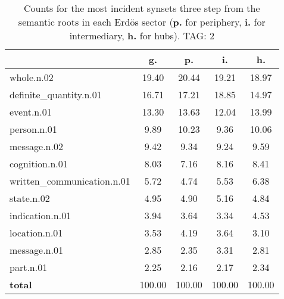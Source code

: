 \begin{table}[h!]
\begin{center}
\begin{tabular}{| l | c | c | c | c |}\hline
 & g. & p. & i. & h. \\\hline
whole.n.02 & 19.40  & 20.44  & 19.21  & 18.97 \\\hline
definite\_quantity.n.01 & 16.71  & 17.21  & 18.85  & 14.97 \\\hline
event.n.01 & 13.30  & 13.63  & 12.04  & 13.99 \\\hline
person.n.01 & 9.89  & 10.23  & 9.36  & 10.06 \\\hline
message.n.02 & 9.42  & 9.34  & 9.24  & 9.59 \\\hline
cognition.n.01 & 8.03  & 7.16  & 8.16  & 8.41 \\\hline
written\_communication.n.01 & 5.72  & 4.74  & 5.53  & 6.38 \\\hline
state.n.02 & 4.95  & 4.90  & 5.16  & 4.84 \\\hline
indication.n.01 & 3.94  & 3.64  & 3.34  & 4.53 \\\hline
location.n.01 & 3.53  & 4.19  & 3.64  & 3.10 \\\hline
message.n.01 & 2.85  & 2.35  & 3.31  & 2.81 \\\hline
part.n.01 & 2.25  & 2.16  & 2.17  & 2.34 \\\hline
{{\bf total}} & 100.00  & 100.00  & 100.00  & 100.00 \\\hline
\end{tabular}
\caption{Counts for the most incident synsets three step from the semantic roots in each Erd\"os sector ({\bf p.} for periphery, {\bf i.} for intermediary, {\bf h.} for hubs). TAG: 2}
\end{center}
\end{table}